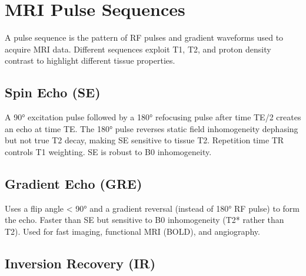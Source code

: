 \section{MRI Pulse Sequences}\label{sec:wiki_mri_sequences}



A pulse sequence is the pattern of RF pulses and gradient waveforms used to acquire MRI data. Different sequences exploit T1, T2, and proton density contrast to highlight different tissue properties.

				

\subsection{Spin Echo (SE)}

				


				

A 90° excitation pulse followed by a 180° refocusing pulse after time TE/2 creates an echo at time TE. The 180° pulse reverses static field inhomogeneity dephasing but not true T2 decay, making SE sensitive to tissue T2. Repetition time TR controls T1 weighting. SE is robust to B0 inhomogeneity.


				

\subsection{Gradient Echo (GRE)}

				

Uses a flip angle \textless{} 90° and a gradient reversal (instead of 180° RF pulse) to form the echo. Faster than SE but sensitive to B0 inhomogeneity (T2* rather than T2). Used for fast imaging, functional MRI (BOLD), and angiography.

				

\subsection{Inversion Recovery (IR)}

				

